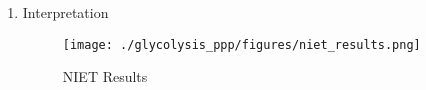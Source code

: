 \documentclass{scrartcl}
\begin{document}
\begin{enumerate}
\begin{itemize}
\item Some ammonia is released by exercising skeletal muscle directly into the circulation
\begin{itemize}
\item removed with a half-life of 20\textpm{}30 min.
\end{itemize}
\item In resting skeletal muscle ammonia is consumed rather than produced
\item \textasciitilde{}50\% of arterial ammonia can be taken up and metabolized by skeletal muscle.
\end{itemize}

\item Interpretation
\label{sec:org4a76ab6}

\begin{figure}[htbp]
\centering
\texttt{[image: ./glycolysis\_ppp/figures/niet\_results.png]}
\caption[interp]{\label{fig:orge70c662}
NIET Results}
\end{figure}
\end{enumerate}
\end{document}
